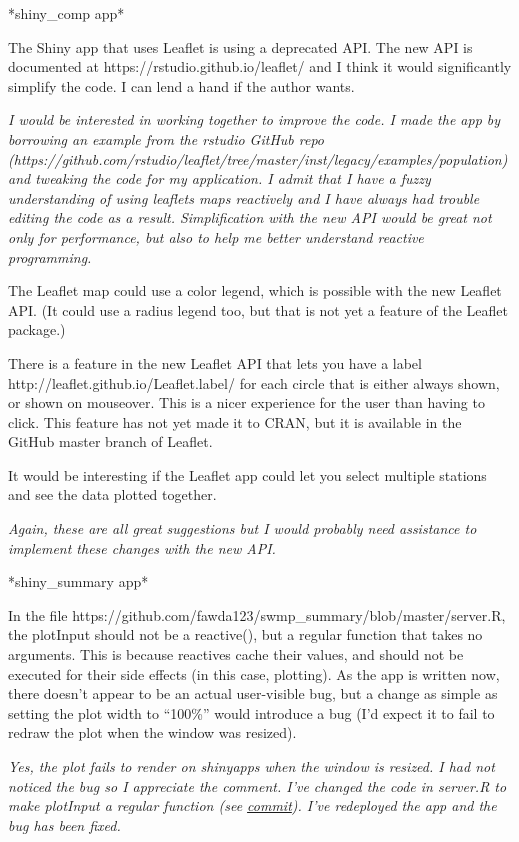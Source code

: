 \documentclass[letterpaper,12pt]{article}\usepackage[]{graphicx}\usepackage[]{color}
\begin{document}
*shiny\_comp app*

The Shiny app that uses Leaflet is using a deprecated API. The new API is documented at https://rstudio.github.io/leaflet/ and I think it would significantly simplify the code. I can lend a hand if the author wants.

{\it I would be interested in working together to improve the code.  I made the app by borrowing an example from the rstudio GitHub repo (https://github.com/rstudio/leaflet/tree/master/inst/legacy/examples/population) and tweaking the code for my application.  I admit that I have a fuzzy understanding of using leaflets maps reactively and I have always had trouble editing the code as a result.  Simplification with the new API would be great not only for performance, but also to help me better understand reactive programming.}

The Leaflet map could use a color legend, which is possible with the new Leaflet API. (It could use a radius legend too, but that is not yet a feature of the Leaflet package.)

There is a feature in the new Leaflet API that lets you have a label http://leaflet.github.io/Leaflet.label/ for each circle that is either always shown, or shown on mouseover. This is a nicer experience for the user than having to click. This feature has not yet made it to CRAN, but it is available in the GitHub master branch of Leaflet.

It would be interesting if the Leaflet app could let you select multiple stations and see the data plotted together.

{\it Again, these are all great suggestions but I would probably need assistance to implement these changes with the new API.}

*shiny\_summary app*

In the file https://github.com/fawda123/swmp\_summary/blob/master/server.R, the plotInput should not be a reactive(), but a regular function that takes no arguments. This is because reactives cache their values, and should not be executed for their side effects (in this case, plotting). As the app is written now, there doesn't appear to be an actual user-visible bug, but a change as simple as setting the plot width to ``100\%'' would introduce a bug (I'd expect it to fail to redraw the plot when the window was resized).

{\it Yes, the plot fails to render on shinyapps when the window is resized.  I had not noticed the bug so I appreciate the comment.  I've changed the code in server.R to make plotInput a regular function (see \href{https://github.com/fawda123/swmp_summary/commit/907abdd25b543cd5db372a8f30ecd9d7e49611e7}{commit}).  I've redeployed the app and the bug has been fixed.}
\end{document}
